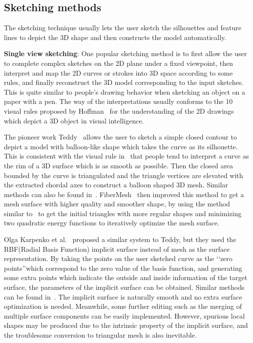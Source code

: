 \subsection{Sketching methods}
\label{ch2:sec:sbim:sketch}


The sketching technique usually lets the user  sketch the
silhouettes and feature lines to depict the 3D shape and then
constructs the model automatically.

\textbf{Single view sketching}: One popular  sketching method is to
first allow the user to complete complex sketches on the 2D plane
under a fixed viewpoint, then interpret and map the 2D curves or
strokes into 3D space according to some rules, and finally
reconstruct the 3D model corresponding to the input sketches. This
is quite similar to people's drawing behavior when sketching an
object on a paper with a pen. The way of the interpretations usually
conforms to the 10 visual rules proposed by Hoffman~\cite{HD00} for
the understanding of the 2D drawings which depict a 3D object in
visual intelligence.

The pioneer work Teddy~\cite{IMT99} allows the  user to sketch a
simple closed contour to depict a model with balloon-like shape
which takes the curve as its silhouette. This is consistent with the
visual rule in~\cite{HD00} that people tend to interpret a curve as
the rim of a 3D surface which is as smooth as possible. Then the
closed area bounded by the curve is triangulated and the triangle
vertices are elevated with the extracted chordal axes to construct a
balloon shaped 3D mesh. Similar methods can also be found
in~\cite{IH01,IH03}. FiberMesh~\cite{NISA07} then improved this
method to get a mesh surface with higher quality and smoother shape,
by using the method similar to~\cite{NPAI09} to get the initial
triangles with more regular shapes and minimizing two quadratic
energy functions to iteratively optimize the mesh surface.

Olga Karpenko et al.~\cite{KHR02} proposed a  similar system to
Teddy, but they used the RBF(Radial Basis Function) implicit surface
instead of mesh as the surface representation. By taking the points
on the user sketched curve as the \lq\lq{zero points}\rq\rq which
correspond to the zero value of the basis function, and generating
some extra points which indicate the outside and inside information
of the target surface, the parameters of the implicit surface can be
obtained. Similar methods can be found
in~\cite{AJ03,AGB04,TZF04,SWSJ05,SS08,WBC08,BMSdV10}. The implicit
surface is naturally smooth and no extra surface optimization is
needed. Meanwhile, some further editing such as the merging of
multiple surface components can be easily implemented. However,
spurious local shapes may be produced due to the intrinsic property
of the implicit surface, and the troublesome conversion to
triangular mesh is also inevitable.


